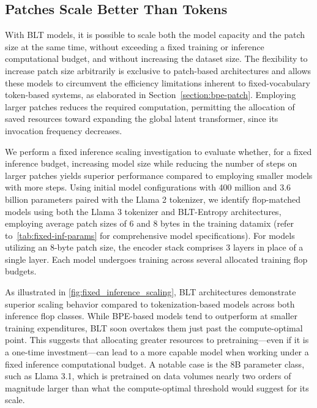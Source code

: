 \subsection{Patches Scale Better Than Tokens} With {\textsc BLT} models, it is possible to scale both the model capacity and the patch size at the same time, without exceeding a fixed training or inference computational budget, and without increasing the dataset size. The flexibility to increase patch size arbitrarily is exclusive to patch-based architectures and allows these models to circumvent the efficiency limitations inherent to fixed-vocabulary token-based systems, as elaborated in Section~\ref{section:bpe-patch}. Employing larger patches reduces the required computation, permitting the allocation of saved resources toward expanding the global latent transformer, since its invocation frequency decreases.

We perform a fixed inference scaling investigation to evaluate whether, for a fixed inference budget, increasing model size while reducing the number of steps on larger patches yields superior performance compared to employing smaller models with more steps. Using initial model configurations with 400 million and 3.6 billion parameters paired with the Llama 2 tokenizer, we identify flop-matched models using both the Llama 3 tokenizer and {\textsc BLT}-Entropy architectures, employing average patch sizes of 6 and 8 bytes in the training datamix (refer to~\autoref{tab:fixed-inf-params} for comprehensive model specifications). For models utilizing an 8-byte patch size, the encoder stack comprises 3 layers in place of a single layer. Each model undergoes training across several allocated training flop budgets.

As illustrated in \autoref{fig:fixed_inference_scaling}, {\textsc BLT} architectures demonstrate superior scaling behavior compared to tokenization-based models across both inference flop classes. While BPE-based models tend to outperform at smaller training expenditures, {\textsc BLT} soon overtakes them just past the compute-optimal point. This suggests that allocating greater resources to pretraining—even if it is a one-time investment—can lead to a more capable model when working under a fixed inference computational budget. A notable case is the 8B parameter class, such as Llama 3.1, which is pretrained on data volumes nearly two orders of magnitude larger than what the compute-optimal threshold would suggest for its scale.

